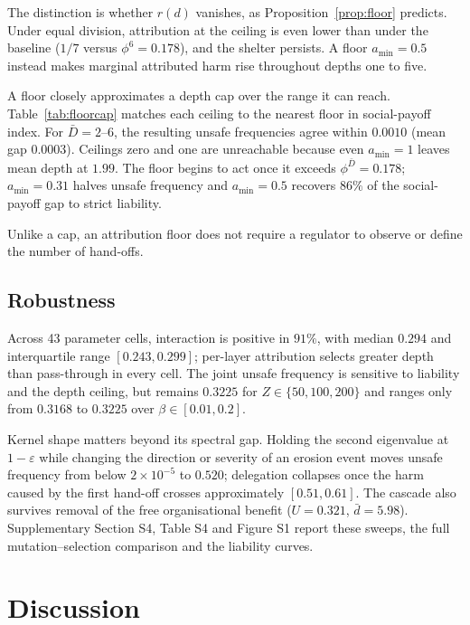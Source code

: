 \documentclass[a4paper,fleqn]{cas-sc}
\begin{document}
The distinction is whether $r(d)$ vanishes, as
Proposition~\ref{prop:floor} predicts. Under equal division, attribution at the
ceiling is even lower than under the baseline ($1/7$ versus $\phi^6=0.178$),
and the shelter persists. A floor $a_{\min}=0.5$ instead makes marginal
attributed harm rise throughout depths one to five.



A floor closely approximates a depth cap over the range it can reach.
Table~\ref{tab:floorcap} matches each ceiling to the nearest floor in
social-payoff index. For $\bar D=2$--$6$, the resulting unsafe frequencies agree
within $0.0010$ (mean gap $0.0003$). Ceilings zero and one are unreachable
because even $a_{\min}=1$ leaves mean depth at $1.99$. The floor begins to act
once it exceeds $\phi^{\bar D}=0.178$; $a_{\min}=0.31$ halves unsafe frequency
and $a_{\min}=0.5$ recovers $86\%$ of the social-payoff gap to strict liability.

Unlike a cap, an attribution floor does not require a regulator to observe or
define the number of hand-offs.

\subsection{Robustness}
\label{sec:robustness}

Across 43 parameter cells, interaction is positive in $91\%$, with median
$0.294$ and interquartile range $[0.243,0.299]$; per-layer attribution selects
greater depth than pass-through in every cell. The joint unsafe frequency is
sensitive to liability and the depth ceiling, but remains $0.3225$ for
$Z\in\{50,100,200\}$ and ranges only from $0.3168$ to $0.3225$ over
$\beta\in[0.01,0.2]$.

Kernel shape matters beyond its spectral gap. Holding the second eigenvalue at
$1-\varepsilon$ while changing the direction or severity of an erosion event
moves unsafe frequency from below $2\times10^{-5}$ to $0.520$; delegation
collapses once the harm caused by the first hand-off crosses approximately
$[0.51,0.61]$. The cascade also survives removal of the free organisational
benefit ($U=0.321$, $\bar d=5.98$). Supplementary Section S4, Table S4 and
Figure S1 report these sweeps, the full mutation--selection comparison and the
liability curves.

\section{Discussion}
\label{sec:discussion}
\end{document}
